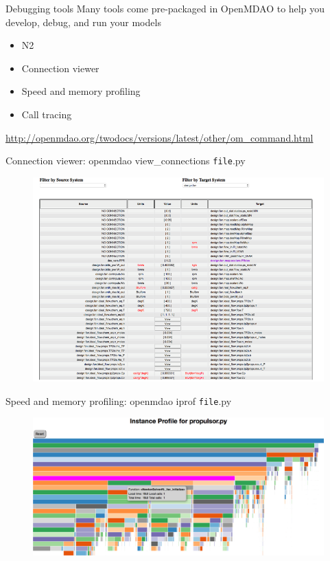 \documentclass[aspectratio=169, usenames,dvipsnames, 14pt]{beamer}
\begin{document}
\begin{frame}{Debugging tools}
	Many tools come pre-packaged in OpenMDAO to help you develop, debug, and run your models
	\begin{itemize}
		\item N2
		\item Connection viewer
		\item Speed and memory profiling
		\item Call tracing
	\end{itemize}
	\url{http://openmdao.org/twodocs/versions/latest/other/om_command.html}
\end{frame}

\begin{frame}{Connection viewer: openmdao view\_connections \texttt{file}.py}
	\begin{figure}
		\includegraphics[scale=.425]{images/slide_127.png}
	\end{figure}
\end{frame}

\begin{frame}{Speed and memory profiling: openmdao iprof \texttt{file}.py}
	\begin{figure}
		\includegraphics[scale=.4]{images/slide_128.png}
	\end{figure}
\end{frame}
\end{document}
